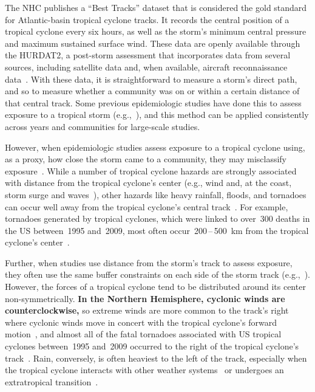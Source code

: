 The \ac{NHC} publishes a ``Best Tracks'' dataset that is considered the gold
standard for Atlantic-basin tropical cyclone tracks.  It records the central
position of a tropical cyclone every six hours, as well as the storm's minimum
central pressure and maximum sustained surface wind.  These data are openly
available through the \ac{HURDAT2}, a post-storm assessment that incorporates
data from several sources, including satellite data and, when available,
aircraft reconnaissance data~\parencite{landsea2013, jarvinen1988}.  With these
data, it is straightforward to measure a storm's direct path, and so to measure
whether a community was on or within a certain distance of that central track.
Some previous epidemiologic studies have done this to assess exposure to a
tropical storm (e.g.,~\cite{currie2013, kinney2008, caillouet2008increase}), 
and this method can be applied consistently across years and communities 
for large-scale studies.

However, when epidemiologic studies assess exposure to a tropical cyclone
using, as a proxy, how close the storm came to a community, they may
misclassify exposure~\parencite{grabich2015measuring}. While a number of
tropical cyclone hazards are strongly associated with distance from the
tropical cyclone's center (e.g., wind and, at the coast, storm surge and
waves~\parencite{rappaport2000, kruk2010}), other hazards like heavy rainfall,
floods, and tornadoes can occur well away from the tropical cyclone's central
track~\parencite{rappaport2000, atallah2007, moore2012}.  For example,
tornadoes generated by tropical cyclones, which were linked to over~300 deaths
in the \ac{US} between~1995 and~2009, most often
occur~200\,--\,500~\si{\kilo\metre} from the tropical cyclone's
center~\parencite{moore2012}.  

Further, when studies use distance from the storm's track to assess exposure,
they often use the same buffer constraints on each side of the storm track
(e.g.,~\cite{kinney2008, currie2013}).  However, the forces of a tropical
cyclone tend to be distributed around its center non-symmetrically.  \textbf{In
the Northern Hemisphere, cyclonic winds are counterclockwise,} so extreme winds
are more common to the track's right where cyclonic winds move in concert with
the tropical cyclone's forward motion~\parencite{halverson2015}, and almost all
of the fatal tornadoes associated with \ac{US} tropical cyclones between~1995
and~2009 occurred to the right of the tropical cyclone's
track~\parencite{moore2012}.  Rain, conversely, is often heaviest to the left
of the track, especially when the tropical cyclone interacts with other weather
systems~\parencite{atallah2003, atallah2007, zhu2013variations} or undergoes an
extratropical transition~\parencite{elsberry2002}.  

